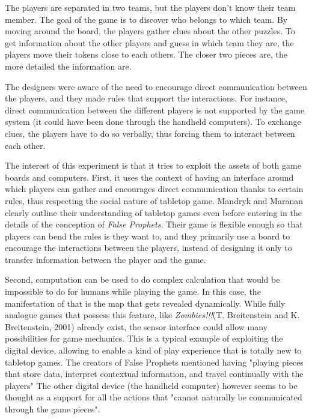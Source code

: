 The players are separated in two teams, but the players don't know their team member. The goal of the game is to discover who belongs to which team. By moving around the board, the players gather clues about the other puzzles. To get information about the other players and guess in which team they are, the players move their tokens close to each others. The closer two pieces are, the more detailed the information are. 

The designers were aware of the need to encourage direct communication between the players, and they made rules that support the interactions. For instance, direct communication between the different players is not supported by the game system (it could have been done through the handheld computers). To exchange clues, the players have to do so verbally, thus forcing them to interact between each other. 

The interest of this experiment is that it tries to exploit the assets of both game boards and computers. First, it uses the context of having an interface around which players can gather and encourages direct communication thanks to certain rules, thus respecting the social nature of tabletop game. Mandryk and Maranan clearly outline their understanding of tabletop games even before entering in the details of the conception of \textit{False Prophets}. Their game is flexible enough so that players can bend the rules is they want to, and they primarily use a board to encourage the interactions between the players, instead of designing it only to transfer information between the player and the game.

Second, computation can be used to do complex calculation that would be impossible to do for humans while playing the game. In this case, the manifestation of that is the map that gets revealed dynamically.  While fully analogue games  that possess this feature, like \textit{Zombies!!!}(T. Breitenstein and K. Breitenstein, 2001)\cite{game:zombies} already exist, the sensor interface could allow many possibilities for game mechanics. This is a typical example of exploiting the digital device, allowing to enable a kind of play experience that is totally new to tabletop games. The creators of False Prophets mentioned having "playing pieces that store data, interpret contextual information, and travel continually with the players" The other digital device (the handheld computer) however seems to be thought as a support for all the actions that "cannot naturally be communicated through the game pieces".

